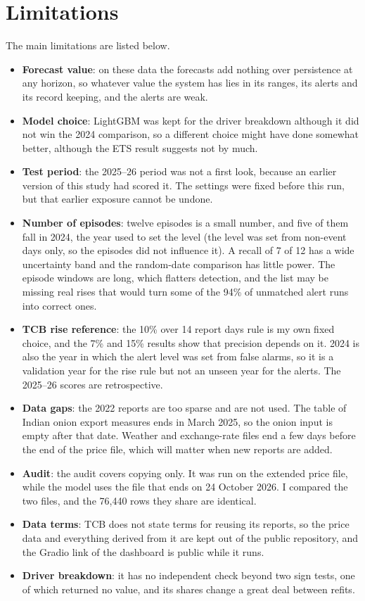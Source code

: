 \section{Limitations}
The main limitations are listed below.
\begin{itemize}
    \item \textbf{Forecast value}: on these data the forecasts add nothing over persistence at any horizon, so whatever value the system has lies in its ranges, its alerts and its record keeping, and the alerts are weak.
    \item \textbf{Model choice}: LightGBM was kept for the driver breakdown although it did not win the 2024 comparison, so a different choice might have done somewhat better, although the ETS result suggests not by much.
    \item \textbf{Test period}: the 2025--26 period was not a first look, because an earlier version of this study had scored it. The settings were fixed before this run, but that earlier exposure cannot be undone.
    \item \textbf{Number of episodes}: twelve episodes is a small number, and five of them fall in 2024, the year used to set the level (the level was set from non-event days only, so the episodes did not influence it). A recall of 7 of 12 has a wide uncertainty band and the random-date comparison has little power. The episode windows are long, which flatters detection, and the list may be missing real rises that would turn some of the 94\% of unmatched alert runs into correct ones.
    \item \textbf{TCB rise reference}: the 10\% over 14 report days rule is my own fixed choice, and the 7\% and 15\% results show that precision depends on it. 2024 is also the year in which the alert level was set from false alarms, so it is a validation year for the rise rule but not an unseen year for the alerts. The 2025--26 scores are retrospective.
    \item \textbf{Data gaps}: the 2022 reports are too sparse and are not used. The table of Indian onion export measures ends in March 2025, so the onion input is empty after that date. Weather and exchange-rate files end a few days before the end of the price file, which will matter when new reports are added.
    \item \textbf{Audit}: the audit covers copying only. It was run on the extended price file, while the model uses the file that ends on 24 October 2026. I compared the two files, and the 76,440 rows they share are identical.
    \item \textbf{Data terms}: TCB does not state terms for reusing its reports, so the price data and everything derived from it are kept out of the public repository, and the Gradio link of the dashboard is public while it runs.
    \item \textbf{Driver breakdown}: it has no independent check beyond two sign tests, one of which returned no value, and its shares change a great deal between refits.
\end{itemize}

